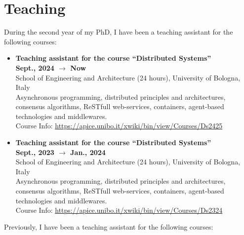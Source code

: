 \documentclass[11pt]{article}
\begin{document}
\section{Teaching}\label{sec:teaching}
%
During the second year of my PhD, I have been a teaching assistant for the following courses:
%
\begin{itemize}
	\item \textbf{Teaching assistant for the course ``Distributed Systems'' }
	\\\hfill \textbf{Sept., 2024 $\rightarrow$ Now}
	\\School of Engineering and Architecture (24 hours), University of Bologna, Italy
	\\Asynchronous programming, distributed principles and architectures, consensus algorithms, ReSTfull web-services, containers, agent-based technologies and middlewares.
	\\Course Info: \url{https://apice.unibo.it/xwiki/bin/view/Courses/Ds2425}
	\item \textbf{ Teaching assistant for the course ``Distributed Systems'' }
	\\\hfill \textbf{Sept., 2023 $\rightarrow$ Jan., 2024}
	\\School of Engineering and Architecture (24 hours), University of Bologna, Italy
	\\Asynchronous programming, distributed principles and architectures, consensus algorithms, ReSTfull web-services, containers, agent-based technologies and middlewares.
	\\Course Info: \url{https://apice.unibo.it/xwiki/bin/view/Courses/Ds2324}
\end{itemize}
%
Previously, I have been a teaching assistant for the following courses:
%
\end{document}
